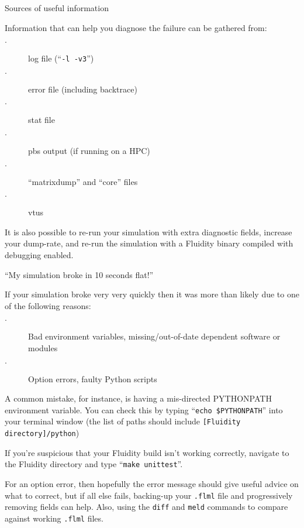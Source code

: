 \documentclass[professionalfonts, 8pt]{beamer}
\begin{document}

\begin{frame}{Sources of useful information}

Information that can help you diagnose the failure can be gathered from:
\vspace{1ex}

\begin{description}
 \item[$\cdot$] log file (``{\tt -l -v3}'')
 \item[$\cdot$] error file (including backtrace)
 \item[$\cdot$] stat file
 \item[$\cdot$] pbs output (if running on a HPC)
 \item[$\cdot$] ``matrixdump'' and ``core'' files
 \item[$\cdot$] vtus
\end{description}

It is also possible to re-run your simulation with extra diagnostic fields, increase your dump-rate, 
and re-run the simulation with a Fluidity binary compiled with debugging enabled.

\end{frame}


\begin{frame}{``My simulation broke in 10 seconds flat!''}

If your simulation broke very very quickly 
then it was more than likely due to one of the following reasons:
\vspace{1ex}

\begin{description}
 \item[$\cdot$] Bad environment variables, missing/out-of-date dependent software or modules
 \item[$\cdot$] Option errors, faulty Python scripts
\end{description}

A common mistake, for instance, is having a mis-directed PYTHONPATH environment variable.  
You can check this by typing ``{\tt echo \$PYTHONPATH}'' into your terminal window 
(the list of paths should include {\tt [Fluidity directory]/python})

\vspace{1ex}
If you're suspicious that your Fluidity build isn't working correctly, navigate to the Fluidity directory and type ``{\tt make unittest}''.

\vspace{1ex}
For an option error, then hopefully the error message should give useful advice on what to correct,
but if all else fails, backing-up your {\tt .flml} file and progressively removing fields can help. 
Also, using the {\tt diff} and {\tt meld} commands to compare against working {\tt .flml} files.
\end{frame}
\end{document}
